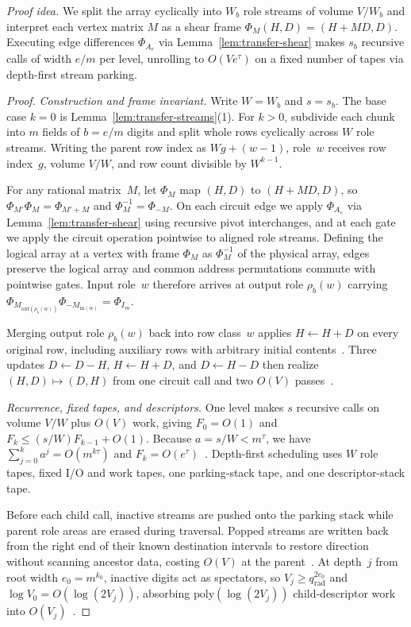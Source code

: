 \emph{Proof idea.}
We split the array cyclically into $W_b$ role streams of volume $V/W_b$ and interpret each vertex matrix $M$ as a shear frame $\Phi_M(H,D)=(H+MD,D)$. Executing edge differences $\Phi_{A_e}$ via Lemma~\ref{lem:transfer-shear} makes $s_b$ recursive calls of width $e/m$ per level, unrolling to $O(V e^\tau)$ on a fixed number of tapes via depth-first stream parking.

\begin{proof}
\emph{Construction and frame invariant.}
Write $W=W_b$ and $s=s_b$. The base case $k=0$ is Lemma~\ref{lem:transfer-streams}(1). For $k>0$, subdivide each chunk into $m$ fields of $b=e/m$ digits and split whole rows cyclically across $W$ role streams. Writing the parent row index as $Wg+(w-1)$, role~$w$ receives row index~$g$, volume $V/W$, and row count divisible by $W^{k-1}$.

For any rational matrix~$M$, let $\Phi_M$ map $(H,D)$ to $(H+MD,D)$, so $\Phi_{M'}\Phi_M=\Phi_{M'+M}$ and $\Phi_M^{-1}=\Phi_{-M}$. On each circuit edge we apply $\Phi_{A_e}$ via Lemma~\ref{lem:transfer-shear} using recursive pivot interchanges, and at each gate we apply the circuit operation pointwise to aligned role streams. Defining the logical array at a vertex with frame $\Phi_M$ as $\Phi_M^{-1}$ of the physical array, edges preserve the logical array and common address permutations commute with pointwise gates. Input role~$w$ therefore arrives at output role $\rho_b(w)$ carrying $\Phi_{M_{\mathrm{out}(\rho_b(w))}}\Phi_{-M_{\mathrm{in}(w)}}=\Phi_{I_m}$.

Merging output role $\rho_b(w)$ back into row class~$w$ applies $H\leftarrow H+D$ on every original row, including auxiliary rows with arbitrary initial contents~\cite[proof of Prop.~11, \S4.2]{OAI26}. Three updates $D\leftarrow D-H$, $H\leftarrow H+D$, and $D\leftarrow H-D$ then realize $(H,D)\mapsto(D,H)$ from one circuit call and two $O(V)$ passes~\cite[proof of Prop.~11, pp.~22--23]{OAI26}.

\emph{Recurrence, fixed tapes, and descriptors.}
One level makes $s$ recursive calls on volume $V/W$ plus $O(V)$ work, giving $F_0=O(1)$ and $F_k\le(s/W)F_{k-1}+O(1)$. Because $a=s/W<m^\tau$, we have $\sum_{j=0}^ka^j=O(m^{k\tau})$ and $F_k=O(e^\tau)$~\cite[proof of Prop.~11, (12)]{OAI26}. Depth-first scheduling uses $W$ role tapes, fixed I/O and work tapes, one parking-stack tape, and one descriptor-stack tape.

Before each child call, inactive streams are pushed onto the parking stack while parent role areas are erased during traversal. Popped streams are written back from the right end of their known destination intervals to restore direction without scanning ancestor data, costing $O(V)$ at the parent~\cite[\S4.2, p.~23]{OAI26}. At depth~$j$ from root width $e_0=m^{k_0}$, inactive digits act as spectators, so $V_j\ge q_{\mathrm{rad}}^{2e_0}$ and $\log V_0=O(\log(2V_j))$, absorbing $\mathrm{poly}(\log(2V_j))$ child-descriptor work into $O(V_j)$~\cite[\S4.2, pp.~23--24]{OAI26}.
\end{proof}

